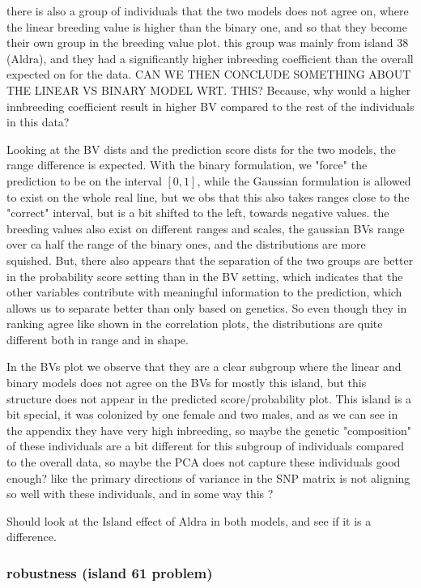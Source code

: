 there is also a group of individuals that the two models does not agree on, where the linear breeding value is higher than the binary one, and so that they become their own group in the breeding value plot. this group was mainly from island 38 (Aldra), and they had a significantly higher inbreeding coefficient than the overall expected on for the data. CAN WE THEN CONCLUDE SOMETHING ABOUT THE LINEAR VS BINARY MODEL WRT. THIS? Because, why would a higher innbreeding coefficient result in higher BV compared to the rest of the individuals in this data? 

Looking at the BV dists and the prediction score dists for the two models, the range difference is expected. With the binary formulation, we "force" the prediction to be on the interval $[0,1]$, while the Gaussian formulation is allowed to exist on the whole real line, but we obs that this also takes ranges close to the "correct" interval, but is a bit shifted to the left, towards negative values.
the breeding values also exist on different ranges and scales, the gaussian BVs range over ca half the range of the binary ones, and the distributions are more squished. But, there also appears that the separation of the two groups are better in the probability score setting than in the BV setting, which indicates that the other variables contribute with meaningful information to the prediction, which allows us to separate better than only based on genetics. So even though they in ranking agree like shown in the correlation plots, the distributions are quite different both in range and in shape. 



In the BVs plot we observe that they are a clear subgroup where the linear and binary models does not agree on the BVs for mostly this island, but this structure does not appear in the predicted score/probability plot. This island is a bit special, it was colonized by one female and two males, and as we can see in the appendix they have very high inbreeding, so maybe the genetic "composition" of these individuals are a bit different for this subgroup of individuals compared to the overall data, so maybe the PCA does not capture these individuals good enough? like the primary directions of variance in the SNP matrix is not aligning so well with these individuals, and in some way this ?    

Should look at the Island effect of Aldra in both models, and see if it is a difference.  

\subsubsection{robustness (island 61 problem)}

